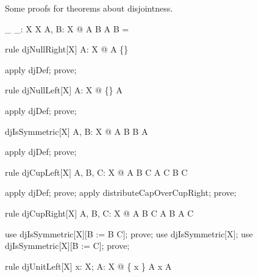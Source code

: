 \documentclass{article}
\begin{document}
Some proofs for theorems about disjointness.


\begin{gendef}[X]
  \_ \dj \_: \power X \rel \power X
\where
{}
  \forall A, B: \power X @ A \dj B \iff A \cap B = \emptyset
\end{gendef}

\begin{theorem}{rule djNullRight}[X]
  \forall A: \power X @ A \dj \{\}
\end{theorem}

\begin{zproof}
apply djDef;
prove;
\end{zproof}

\begin{theorem}{rule djNullLeft}[X]
  \forall A: \power X @ \{\} \dj A
\end{theorem}

\begin{zproof}
apply djDef;
prove;
\end{zproof}

\begin{theorem}{djIsSymmetric}[X]
  \forall A, B: \power X @ A \dj B \iff B \dj A
\end{theorem}

\begin{zproof}
apply djDef;
prove;
\end{zproof}

\begin{theorem}{rule djCupLeft}[X]
  \forall A, B, C: \power X @
     A \cup B \dj C \iff A \dj C \land B \dj C
\end{theorem}

\begin{zproof}
apply djDef;
prove;
apply distributeCapOverCupRight;
prove;
\end{zproof}


\begin{theorem}{rule djCupRight}[X]
  \forall A, B, C: \power X @
     A \dj B \cup C \iff A \dj B \land A \dj C
\end{theorem}

\begin{zproof}
use djIsSymmetric[X][B := B \cup[X] C];
prove;
use djIsSymmetric[X];
use djIsSymmetric[X][B := C];
prove;
\end{zproof}

\begin{theorem}{rule djUnitLeft}[X]
  \forall x: X; A: \power X @ 
    \{ x \} \dj A \iff \lnot x \in A
\end{theorem}
\end{document}
